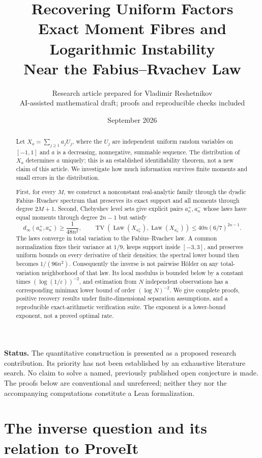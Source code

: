 \documentclass[11pt,a4paper]{article}
\title{\textbf{Recovering Uniform Factors}\\[4pt]
\large Exact Moment Fibres and Logarithmic Instability\\
Near the Fabius--Rvachev Law}
\author{Research article prepared for Vladimir Reshetnikov\\
\small AI-assisted mathematical draft; proofs and reproducible checks included}
\date{September 2026}
\theoremstyle{definition}
\theoremstyle{remark}
\DeclareMathOperator{\TV}{TV}
\DeclareMathOperator{\Law}{Law}
\newcommand{\eps}{\varepsilon}
\begin{document}
\maketitle

\begin{abstract}
Let $X_a=\sum_{j\ge1}a_jU_j$, where the $U_j$ are independent uniform random
variables on $[-1,1]$ and $a$ is a decreasing, nonnegative, summable sequence.
The distribution of $X_a$ determines $a$ uniquely; this is an established
identifiability theorem, not a new claim of this article. We investigate how
much information survives finite moments and small errors in the distribution.

First, for every $M$, we construct a nonconstant real-analytic family through
the dyadic Fabius--Rvachev spectrum that preserves its exact support and all
moments through degree $2M+1$. Second, Chebyshev level sets give explicit
pairs $a_n^+,a_n^-$ whose laws have equal moments through degree $2n-1$ but
satisfy
\[
 d_\infty(a_n^+,a_n^-)\ge\frac1{48n^2},\qquad
 \TV(\Law(X_{a_n^+}),\Law(X_{a_n^-}))
 \le 40n(6/7)^{2n-1}.
\]
The laws converge in total variation to the Fabius--Rvachev law. A common
normalization fixes their variance at $1/9$, keeps support inside $[-3,3]$,
and preserves uniform bounds on every derivative of their densities; the
spectral lower bound then becomes $1/(96n^2)$.
Consequently the inverse is not pairwise H\"older on any total-variation
neighborhood of that law. Its local modulus is bounded below by a constant
times $(\log(1/\eps))^{-2}$, and estimation from $N$ independent observations
has a corresponding minimax lower bound of order $(\log N)^{-2}$.
We give complete proofs, positive recovery results under finite-dimensional
separation assumptions, and a reproducible exact-arithmetic verification
suite. The exponent is a lower-bound exponent, not a proved optimal rate.
\end{abstract}

\noindent\textbf{Status.} The quantitative construction is presented as a proposed
research contribution. Its priority has not been established by an exhaustive
literature search. No claim to solve a named, previously published open
conjecture is made. The proofs below are conventional and unrefereed; neither
they nor the accompanying computations constitute a Lean formalization.

\clearpage
\tableofcontents
\clearpage

\section{The inverse question and its relation to ProveIt}
\label{sec:intro}
\end{document}
